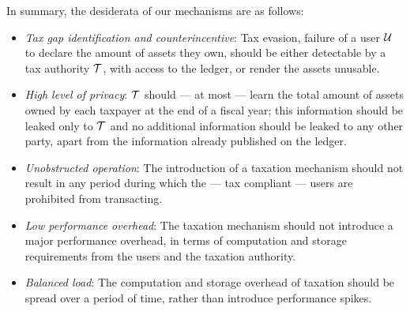 In summary, the desiderata of our mechanisms are as follows:
\begin{itemize}
    \item \emph{Tax gap identification and counterincentive}: Tax evasion, \ie failure of a user
        $\mathcal{U}$ to declare the amount of assets they own, should be either
        detectable by a tax authority $\mathcal{T}$, with access to the
        ledger, or render the assets unusable.
    \item \emph{High level of privacy}: $\mathcal{T}$ should --- at most ---
        learn the total amount of assets owned by each taxpayer at the end of a
        fiscal year; this information should be leaked only to $\mathcal{T}$ and
        no additional information should be leaked to any other party, apart
        from the information already published on the ledger.
    \item \emph{Unobstructed operation}: The introduction of a taxation
        mechanism should not result in any period during which the --- tax
        compliant --- users are prohibited from transacting.
    \item \emph{Low performance overhead}: The taxation mechanism should not
        introduce a major performance overhead, in terms of computation and
        storage requirements from the users and the taxation authority.
    \item \emph{Balanced load}: The computation and storage overhead of
        taxation should be spread over a period of time, rather than introduce
        performance spikes.
\end{itemize}
